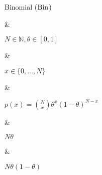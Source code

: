 Binomial ($\operatorname{Bin}$)

&

$N \in \mathbb N, \theta \in [0, 1]$

& 

$x \in \{0, \dotsc, N\}$

&

\(\displaystyle
	p(x) = \binom{N}{x} \theta^x (1 - \theta)^{N - x}
\)

& 

$N\theta$

&

$N\theta(1 - \theta)$
